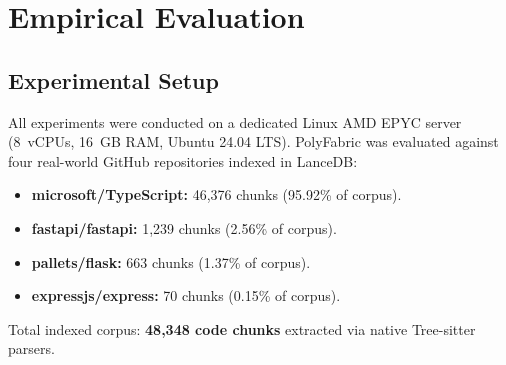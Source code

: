 \documentclass[10pt,journal,compsoc]{IEEEtran}
\begin{document}
\section{Empirical Evaluation}

\subsection{Experimental Setup}
All experiments were conducted on a dedicated Linux AMD EPYC server (8~vCPUs, 16~GB RAM, Ubuntu 24.04 LTS). PolyFabric was evaluated against four real-world GitHub repositories indexed in LanceDB:
\begin{itemize}
    \item \textbf{microsoft/TypeScript:} 46,376 chunks (95.92\% of corpus).
    \item \textbf{fastapi/fastapi:} 1,239 chunks (2.56\% of corpus).
    \item \textbf{pallets/flask:} 663 chunks (1.37\% of corpus).
    \item \textbf{expressjs/express:} 70 chunks (0.15\% of corpus).
\end{itemize}
Total indexed corpus: \textbf{48,348 code chunks} extracted via native Tree-sitter parsers.
\end{document}
